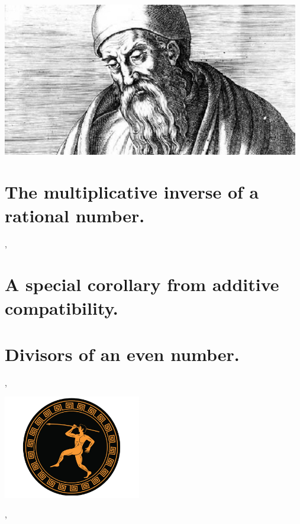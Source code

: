 \documentclass[preview]{standalone}
\begin{document}
\begin{center}
    \includegraphics[width=13cm]{../resources/jpg/1.6.introduction.to.proofs/euclid.jpg}
\end{center}
\section{The multiplicative inverse of a rational number.}

\sep
\vspace{0.5\baselineskip}

\section{A special corollary from additive compatibility.}

\pagebreak


\section{Divisors of an even number.}

\sep
\vspace{0.2\baselineskip}
\begin{center}
    \includegraphics[width=6cm]{../resources/jpg/1.6.introduction.to.proofs/olympics.jpg}
\end{center}
\sep
\end{document}

